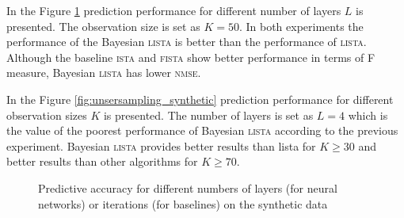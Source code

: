 \documentclass[letterpaper]{article}
\begin{document}
In the Figure \ref{fig:number_of_layers_synthetic} prediction performance for different number of layers $L$ is presented. The observation size is set as $K=50$. In both experiments the performance of the Bayesian \textsc{lista} is better than the performance of \textsc{lista}. Although the baseline \textsc{ista} and \textsc{fista} show better performance in terms of F measure, Bayesian \textsc{lista} has lower \textsc{nmse}.

In the Figure \ref{fig:unsersampling_synthetic} prediction performance for different observation sizes $K$ is presented. The number of layers is set as $L=4$ which is the value of the poorest performance of Bayesian \textsc{lista} according to the previous experiment. Bayesian \textsc{lista} provides better results than {lista} for $K \ge 30$ and better results than other algorithms for $K \ge 70$.

\begin{figure}[t]
\centering
\caption{Predictive accuracy for different numbers of layers (for neural networks) or iterations (for baselines) on the synthetic data}
\label{fig:number_of_layers_synthetic}
\end{figure}
\end{document}
